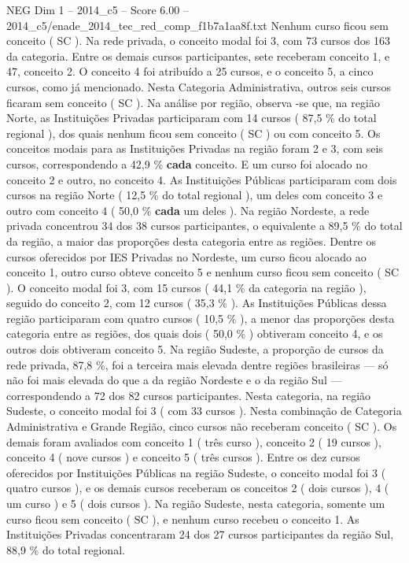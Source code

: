\begin{textsample}{NEG Dim 1 – 2014\_c5 – Score 6.00 – 2014\_c5/enade\_2014\_tec\_red\_comp\_f1b7a1aa8f.txt}
Nenhum curso ficou sem conceito ( SC ).
Na rede privada, o conceito modal foi 3, com 73 cursos dos 163 da categoria.
Entre os demais cursos participantes, sete receberam conceito 1, e 47, conceito 2.
O conceito 4 foi atribuído a 25 cursos, e o conceito 5, a cinco cursos, como já mencionado.
Nesta Categoria Administrativa, outros seis cursos ficaram sem conceito ( SC ).
Na análise por região, observa -se que, na região Norte, as Instituições Privadas participaram com 14 cursos ( 87,5 \% do total regional ), dos quais nenhum ficou sem conceito ( SC ) ou com conceito 5.
Os conceitos modais para as Instituições Privadas na região foram 2 e 3, com seis cursos, correspondendo a 42,9 \% \textbf{cada} conceito.
E um curso foi alocado no conceito 2 e outro, no conceito 4.
As Instituições Públicas participaram com dois cursos na região Norte ( 12,5 \% do total regional ), um deles com conceito 3 e outro com conceito 4 ( 50,0 \% \textbf{cada} um deles ).
Na região Nordeste, a rede privada concentrou 34 dos 38 cursos participantes, o equivalente a 89,5 \% do total da região, a maior das proporções desta categoria entre as regiões.
Dentre os cursos oferecidos por IES Privadas no Nordeste, um curso ficou alocado ao conceito 1, outro curso obteve conceito 5 e nenhum curso ficou sem conceito ( SC ).
O conceito modal foi 3, com 15 cursos ( 44,1 \% da categoria na região ), seguido do conceito 2, com 12 cursos ( 35,3 \% ).
As Instituições Públicas dessa região participaram com quatro cursos ( 10,5 \% ), a menor das proporções desta categoria entre as regiões, dos quais dois ( 50,0 \% ) obtiveram conceito 4, e os outros dois obtiveram conceito 5.
Na região Sudeste, a proporção de cursos da rede privada, 87,8 \%, foi a terceira mais elevada dentre regiões brasileiras — só não foi mais elevada do que a da região Nordeste e o da região Sul — correspondendo a 72 dos 82 cursos participantes.
Nesta categoria, na região Sudeste, o conceito modal foi 3 ( com 33 cursos ).
Nesta combinação de Categoria Administrativa e Grande Região, cinco cursos não receberam conceito ( SC ).
Os demais foram avaliados com conceito 1 ( três curso ), conceito 2 ( 19 cursos ), conceito 4 ( nove cursos ) e conceito 5 ( três cursos ).
Entre os dez cursos oferecidos por Instituições Públicas na região Sudeste, o conceito modal foi 3 ( quatro cursos ), e os demais cursos receberam os conceitos 2 ( dois cursos ), 4 ( um curso ) e 5 ( dois cursos ).
Na região Sudeste, nesta categoria, somente um curso ficou sem conceito ( SC ), e nenhum curso recebeu o conceito 1.
As Instituições Privadas concentraram 24 dos 27 cursos participantes da região Sul, 88,9 \% do total regional.

\end{textsample}
